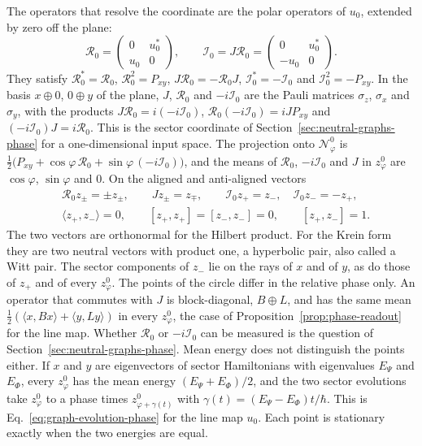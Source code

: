 The operators that resolve the coordinate are the polar operators of $u_0$, extended by zero off the plane:
\begin{equation}
 \mathcal R_0=\begin{pmatrix}0&u_0^*\\ u_0&0\end{pmatrix},\qquad
 \mathcal I_0=J\mathcal R_0=\begin{pmatrix}0&u_0^*\\ -u_0&0\end{pmatrix}.
 \label{eq:ground-plane-operators}
\end{equation}
They satisfy $\mathcal R_0^*=\mathcal R_0$, $\mathcal R_0^2=P_{xy}$, $J\mathcal R_0=-\mathcal R_0J$, $\mathcal I_0^*=-\mathcal I_0$ and $\mathcal I_0^2=-P_{xy}$. In the basis $x\oplus0$, $0\oplus y$ of the plane, $J$, $\mathcal R_0$ and $-i\mathcal I_0$ are the Pauli matrices $\sigma_z$, $\sigma_x$ and $\sigma_y$, with the products $J\mathcal R_0=i(-i\mathcal I_0)$, $\mathcal R_0(-i\mathcal I_0)=iJP_{xy}$ and $(-i\mathcal I_0)J=i\mathcal R_0$. This is the sector coordinate of Section~\ref{sec:neutral-graphs-phase} for a one-dimensional input space. The projection onto $\mathcal N^0_\varphi$ is $\tfrac12\bigl(P_{xy}+\cos\varphi\,\mathcal R_0+\sin\varphi\,(-i\mathcal I_0)\bigr)$, and the means of $\mathcal R_0$, $-i\mathcal I_0$ and $J$ in $z^0_\varphi$ are $\cos\varphi$, $\sin\varphi$ and $0$. On the aligned and anti-aligned vectors
\begin{align}
 &\mathcal R_0z_\pm=\pm z_\pm,\qquad Jz_\pm=z_\mp,\qquad
 \mathcal I_0z_+=z_-,\quad \mathcal I_0z_-=-z_+ ,
 \label{eq:ground-plane-eigenlines}\\
 &\langle z_+,z_-\rangle=0,\qquad [z_+,z_+]=[z_-,z_-]=0,\qquad [z_+,z_-]=1 .
 \label{eq:ground-plane-witt}
\end{align}
The two vectors are orthonormal for the Hilbert product. For the Krein form they are two neutral vectors with product one, a hyperbolic pair, also called a Witt pair. The sector components of $z_-$ lie on the rays of $x$ and of $y$, as do those of $z_+$ and of every $z^0_\varphi$. The points of the circle differ in the relative phase only. An operator that commutes with $J$ is block-diagonal, $B\oplus L$, and has the same mean $\tfrac12(\langle x,Bx\rangle+\langle y,Ly\rangle)$ in every $z^0_\varphi$, the case of Proposition~\ref{prop:phase-readout} for the line map. Whether $\mathcal R_0$ or $-i\mathcal I_0$ can be measured is the question of Section~\ref{sec:neutral-graphs-phase}. Mean energy does not distinguish the points either. If $x$ and $y$ are eigenvectors of sector Hamiltonians with eigenvalues $E_\Psi$ and $E_\Phi$, every $z^0_\varphi$ has the mean energy $(E_\Psi+E_\Phi)/2$, and the two sector evolutions take $z^0_\varphi$ to a phase times $z^0_{\varphi+\gamma(t)}$ with $\gamma(t)=(E_\Psi-E_\Phi)t/\hbar$. This is Eq.~\eqref{eq:graph-evolution-phase} for the line map $u_0$. Each point is stationary exactly when the two energies are equal.

